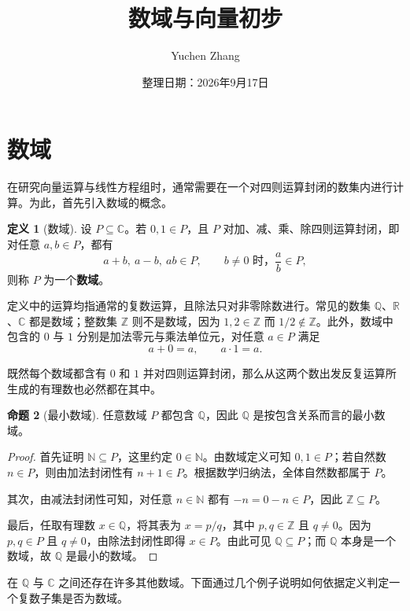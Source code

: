 \documentclass[UTF8, fontset=fandol, a4paper, 12pt]{ctexart}
\title{数域与向量初步}
\author{Yuchen Zhang}
\date{整理日期：2026年9月17日}
\makeatletter
\newcommand{\Q}{\mathbb{Q}}
\newcommand{\R}{\mathbb{R}}
\newcommand{\C}{\mathbb{C}}
\newcommand{\Z}{\mathbb{Z}}
\newcommand{\N}{\mathbb{N}}
\theoremstyle{definition}
\newtheorem{definition}{定义}[section]
\newtheorem{proposition}[definition]{命题}
\renewcommand{\maketitle}{%
  \begin{center}
    {\LARGE\bfseries \@title\par}\vspace{0.6em}
    \@author\par\vspace{0.2em}
    {\small \@date\par}
  \end{center}
}
\makeatother
\begin{document}
\maketitle

\section{数域}

在研究向量运算与线性方程组时，通常需要在一个对四则运算封闭的数集内进行计算。为此，首先引入数域的概念。

\begin{definition}[数域]
设 $P\subseteq\C$。若 $0,1\in P$，且 $P$ 对加、减、乘、除四则运算封闭，即对任意 $a,b\in P$，都有
\[
  a+b,\ a-b,\ ab\in P,
  \qquad b\ne0\text{ 时，}\frac{a}{b}\in P,
\]
则称 $P$ 为一个\textbf{数域}。
\end{definition}

定义中的运算均指通常的复数运算，且除法只对非零除数进行。常见的数集 $\Q$、$\R$、$\C$ 都是数域；整数集 $\Z$ 则不是数域，因为 $1,2\in\Z$ 而 $1/2\notin\Z$。此外，数域中包含的 $0$ 与 $1$ 分别是加法零元与乘法单位元，对任意 $a\in P$ 满足
\[
  a+0=a,\qquad a\cdot1=a.
\]

既然每个数域都含有 $0$ 和 $1$ 并对四则运算封闭，那么从这两个数出发反复运算所生成的有理数也必然都在其中。

\begin{proposition}[最小数域]
任意数域 $P$ 都包含 $\Q$，因此 $\Q$ 是按包含关系而言的最小数域。
\end{proposition}
\begin{proof}
首先证明 $\N\subseteq P$，这里约定 $0\in\N$。由数域定义可知 $0,1\in P$；若自然数 $n\in P$，则由加法封闭性有 $n+1\in P$。根据数学归纳法，全体自然数都属于 $P$。

其次，由减法封闭性可知，对任意 $n\in\N$ 都有 $-n=0-n\in P$，因此 $\Z\subseteq P$。

最后，任取有理数 $x\in\Q$，将其表为 $x=p/q$，其中 $p,q\in\Z$ 且 $q\ne0$。因为 $p,q\in P$ 且 $q\ne0$，由除法封闭性即得 $x\in P$。由此可见 $\Q\subseteq P$；而 $\Q$ 本身是一个数域，故 $\Q$ 是最小的数域。
\end{proof}

在 $\Q$ 与 $\C$ 之间还存在许多其他数域。下面通过几个例子说明如何依据定义判定一个复数子集是否为数域。
\end{document}
